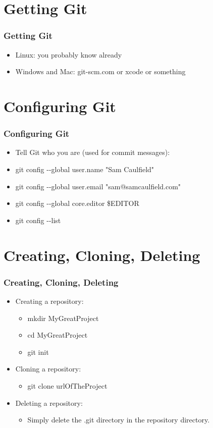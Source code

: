 \documentclass{beamer}
\begin{document}
\section{Getting Git}
\begin{frame}
\frametitle{Getting Git}
\begin{itemize}
\pause
\item Linux: you probably know already
\pause
\item Windows and Mac: git-scm.com or xcode or something
\end{itemize}
\end{frame}


\section{Configuring Git}
\begin{frame}
\frametitle{Configuring Git}
\begin{itemize}
\pause
\item Tell Git who you are (used for commit messages):
\pause
\item git config -{}-global user.name "Sam Caulfield"
\pause
\item git config -{}-global user.email "sam@samcaulfield.com"
\pause
\item git config -{}-global core.editor \$EDITOR
\pause
\item git config -{}-list
\end{itemize}
\end{frame}


\section{Creating, Cloning, Deleting}
\begin{frame}
\frametitle{Creating, Cloning, Deleting}
\begin{itemize}
\pause
\item Creating a repository:
	\begin{itemize}
	\pause
	\item mkdir MyGreatProject
	\pause
	\item cd MyGreatProject
	\pause
	\item git init
	\end{itemize}
\pause
\item Cloning a repository:
	\begin{itemize}
	\pause
	\item git clone urlOfTheProject
	\end{itemize}
\pause
\item Deleting a repository:
	\begin{itemize}
	\pause
	\item Simply delete the .git directory in the repository directory.
	\end{itemize}
\end{itemize}
\end{frame}
\end{document}
